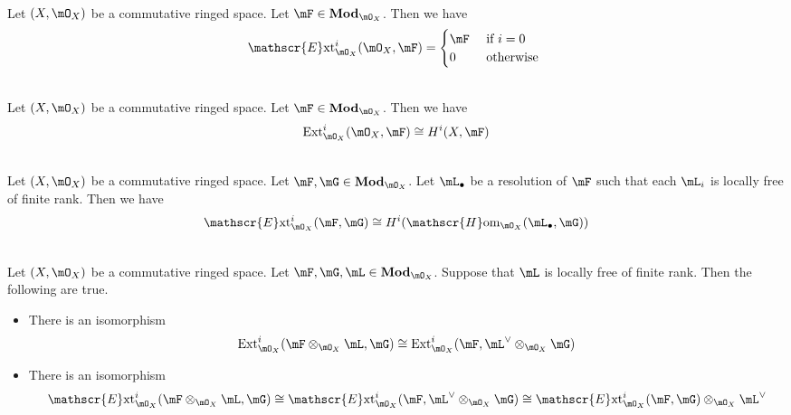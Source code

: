 \documentclass[a4paper]{article}
\begin{document}
\begin{prp}{}{}\\
Let $(X,\mO_X)$ be a commutative ringed space. Let $\mF\in\bold{Mod}_{\mO_X}$. Then we have $$\mathscr{E}\text{xt}_{\mO_X}^i(\mO_X,\mF)=\begin{cases}
\mF & \text{ if }i=0\\
0 & \text{ otherwise }
\end{cases}$$
\end{prp}

\begin{prp}{}{}\\
Let $(X,\mO_X)$ be a commutative ringed space. Let $\mF\in\bold{Mod}_{\mO_X}$. Then we have $$\text{Ext}_{\mO_X}^i(\mO_X,\mF)\cong H^i(X,\mF)$$
\end{prp}

\begin{prp}{}{}\\
Let $(X,\mO_X)$ be a commutative ringed space. Let $\mF,\mG\in\bold{Mod}_{\mO_X}$. Let $\mL_\bullet$ be a resolution of $\mF$ such that each $\mL_i$ is locally free of finite rank. Then we have $$\mathscr{E}\text{xt}_{\mO_X}^i(\mF,\mG)\cong H^i(\mathscr{H}\text{om}_{\mO_X}(\mL_\bullet,\mG))$$
\end{prp}

\begin{prp}{}{}\\
Let $(X,\mO_X)$ be a commutative ringed space. Let $\mF,\mG,\mL\in\bold{Mod}_{\mO_X}$. Suppose that $\mL$ is locally free of finite rank. Then the following are true. 
\begin{itemize}
\item There is an isomorphism $$\text{Ext}_{\mO_X}^i(\mF\otimes_{\mO_X}\mL,\mG)\cong\text{Ext}_{\mO_X}^i(\mF,\mL^\vee\otimes_{\mO_X}\mG)$$
\item There is an isomorphism $$\mathscr{E}\text{xt}_{\mO_X}^i(\mF\otimes_{\mO_X}\mL,\mG)\cong\mathscr{E}\text{xt}_{\mO_X}^i(\mF,\mL^\vee\otimes_{\mO_X}\mG)\cong\mathscr{E}\text{xt}_{\mO_X}^i(\mF,\mG)\otimes_{\mO_X}\mL^\vee$$
\end{itemize}
\end{prp}
\end{document}
